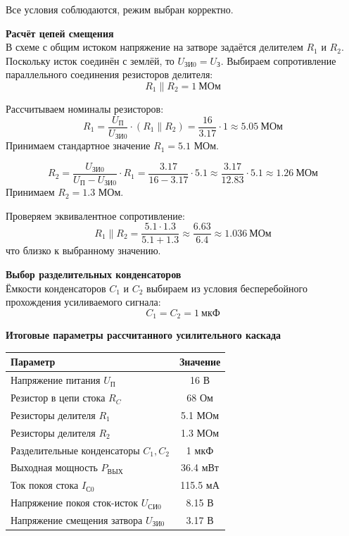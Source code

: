 Все условия соблюдаются, режим выбран корректно.

\textbf{Расчёт цепей смещения}\\

В схеме с общим истоком напряжение на затворе задаётся делителем $R_1$ и $R_2$. Поскольку исток соединён с землёй, то $U_\text{ЗИ0} = U_З$. Выбираем сопротивление параллельного соединения резисторов делителя:
$$
R_1 \parallel R_2 = 1\ \text{МОм}
$$

Рассчитываем номиналы резисторов:
$$
R_1 = \frac{U_\text{П}}{U_\text{ЗИ0}} \cdot (R_1 \parallel R_2) = \frac{16}{3.17} \cdot 1 \approx 5.05\ \text{МОм}
$$
Принимаем стандартное значение $R_1 = 5.1$ МОм.

$$
R_2 = \frac{U_\text{ЗИ0}}{U_\text{П} - U_\text{ЗИ0}} \cdot R_1 = \frac{3.17}{16 - 3.17} \cdot 5.1 \approx \frac{3.17}{12.83} \cdot 5.1 \approx 1.26\ \text{МОм}
$$
Принимаем $R_2 = 1.3$ МОм.

Проверяем эквивалентное сопротивление:
$$
R_1 \parallel R_2 = \frac{5.1 \cdot 1.3}{5.1 + 1.3} \approx \frac{6.63}{6.4} \approx 1.036\ \text{МОм}
$$
что близко к выбранному значению.

\textbf{Выбор разделительных конденсаторов}\\

Ёмкости конденсаторов $C_1$ и $C_2$ выбираем из условия бесперебойного прохождения усиливаемого сигнала:
$$
C_1 = C_2 = 1\ \text{мкФ}
$$

\textbf{Итоговые параметры рассчитанного усилительного каскада}\\

\begin{table}[H]
\centering
\begin{tabular}{|l|c|}
\hline
\textbf{Параметр} & \textbf{Значение} \\ \hline
Напряжение питания $U_\text{П}$ & 16 В \\ \hline
Резистор в цепи стока $R_C$ & 68 Ом \\ \hline
Резисторы делителя $R_1$ & 5.1 МОм \\ \hline
Резисторы делителя $R_2$ & 1.3 МОм \\ \hline
Разделительные конденсаторы $C_1, C_2$ & 1 мкФ \\ \hline
Выходная мощность $P_\text{ВЫХ}$ & 36.4 мВт \\ \hline
Ток покоя стока $I_\text{С0}$ & 115.5 мА \\ \hline
Напряжение покоя сток-исток $U_\text{СИ0}$ & 8.15 В \\ \hline
Напряжение смещения затвора $U_\text{ЗИ0}$ & 3.17 В \\ \hline
\end{tabular}
\end{table}



